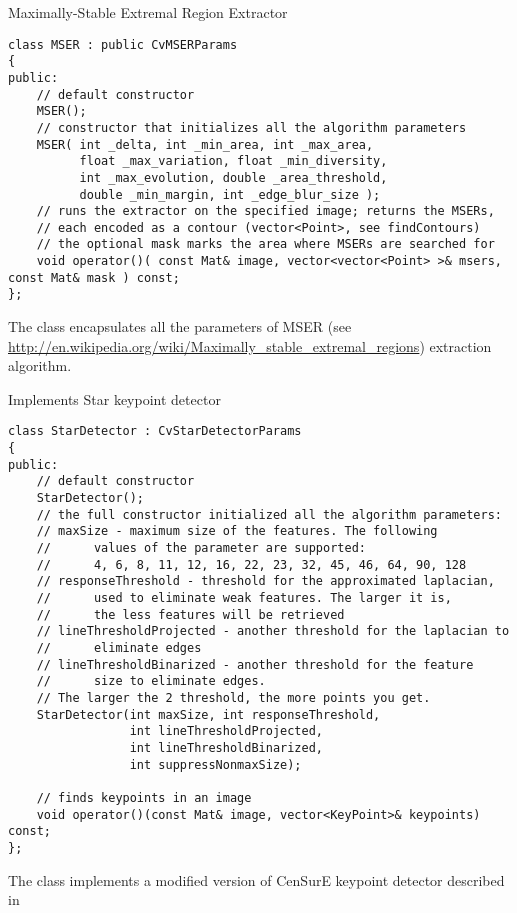 Maximally-Stable Extremal Region Extractor

\begin{lstlisting}
class MSER : public CvMSERParams
{
public:
    // default constructor
    MSER();
    // constructor that initializes all the algorithm parameters
    MSER( int _delta, int _min_area, int _max_area,
          float _max_variation, float _min_diversity,
          int _max_evolution, double _area_threshold,
          double _min_margin, int _edge_blur_size );
    // runs the extractor on the specified image; returns the MSERs,
    // each encoded as a contour (vector<Point>, see findContours)
    // the optional mask marks the area where MSERs are searched for
    void operator()( const Mat& image, vector<vector<Point> >& msers, const Mat& mask ) const;
};
\end{lstlisting}

The class encapsulates all the parameters of MSER (see \url{http://en.wikipedia.org/wiki/Maximally_stable_extremal_regions}) extraction algorithm. 

Implements Star keypoint detector

\begin{lstlisting}
class StarDetector : CvStarDetectorParams
{
public:
    // default constructor
    StarDetector();
    // the full constructor initialized all the algorithm parameters:
    // maxSize - maximum size of the features. The following 
    //      values of the parameter are supported:
    //      4, 6, 8, 11, 12, 16, 22, 23, 32, 45, 46, 64, 90, 128
    // responseThreshold - threshold for the approximated laplacian,
    //      used to eliminate weak features. The larger it is,
    //      the less features will be retrieved
    // lineThresholdProjected - another threshold for the laplacian to 
    //      eliminate edges
    // lineThresholdBinarized - another threshold for the feature 
    //      size to eliminate edges.
    // The larger the 2 threshold, the more points you get.
    StarDetector(int maxSize, int responseThreshold,
                 int lineThresholdProjected,
                 int lineThresholdBinarized,
                 int suppressNonmaxSize);

    // finds keypoints in an image
    void operator()(const Mat& image, vector<KeyPoint>& keypoints) const;
};
\end{lstlisting}

The class implements a modified version of CenSurE keypoint detector described in
\cite{Agrawal08}

